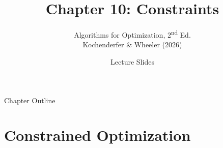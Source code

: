 \documentclass[aspectratio=169,10pt]{beamer}
\title[Ch.10 Constraints]{\textbf{Chapter 10: Constraints}}
\subtitle{Algorithms for Optimization, 2\textsuperscript{nd} Ed.\\
          Kochenderfer \& Wheeler (2026)}
\author{Lecture Slides}
\date{}
\begin{document}

\begin{frame}
  \titlepage
\end{frame}

\begin{frame}{Chapter Outline}
  \tableofcontents
\end{frame}

\section{Constrained Optimization}
\end{document}
